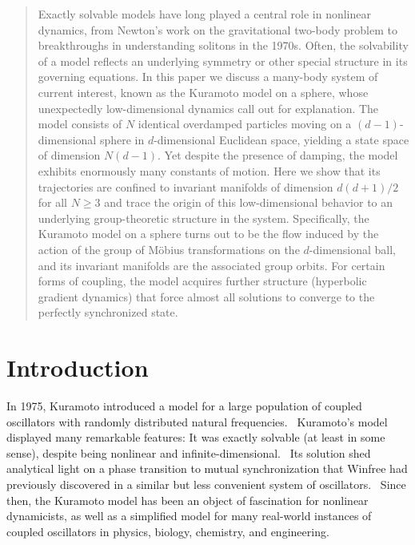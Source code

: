 \documentclass[%
 aip,
 amsmath,amssymb,
 reprint,%
]{revtex4-1}
\begin{document}
\maketitle

\begin{quotation}
Exactly solvable models have long played a central role in nonlinear dynamics, from Newton’s work on the gravitational two-body problem to breakthroughs in understanding solitons in the 1970s. Often, the solvability of a model reflects an underlying symmetry or other special structure in its governing equations. In this paper we discuss a many-body system of current interest, known as the Kuramoto model on a sphere, whose unexpectedly low-dimensional dynamics call out for explanation. The model consists of $N$ identical overdamped particles moving on a $(d-1)$-dimensional sphere in $d$-dimensional Euclidean space, yielding a state space of dimension $N (d-1)$. Yet despite the presence of damping, the model exhibits enormously many constants of motion. Here we show that its trajectories are confined to invariant manifolds of dimension $d(d+1)/2$ for all $N \ge 3$ and trace the origin of this low-dimensional behavior to an underlying group-theoretic structure in the system. Specifically, the Kuramoto model on a sphere turns out to be the flow induced by the action of the group of Möbius transformations on the $d$-dimensional ball, and its invariant manifolds are the associated group orbits. For certain forms of coupling, the model acquires further structure (hyperbolic gradient dynamics) that force almost all solutions to converge to the perfectly synchronized state.  
\end{quotation}  

\section{Introduction} In 1975, Kuramoto introduced a model for a large  population of coupled oscillators with randomly distributed natural frequencies.~\cite{Kuramoto1975self} Kuramoto’s  model displayed many remarkable features: It was exactly solvable (at least in some sense), despite being nonlinear and infinite-dimensional.~\cite{Kuramoto1984chemical} Its  solution shed analytical light on a phase transition to mutual synchronization that Winfree had  previously discovered in a similar but less convenient system of oscillators.~\cite{winfree1967biological, winfree1980} Since then, the  Kuramoto model has been an object of fascination for nonlinear dynamicists, as well as a  simplified model for many real-world instances of coupled oscillators in physics, biology,  chemistry, and engineering.~\cite{strogatz2000Kuramoto, pikovsky2003synchronization, strogatz2003sync, acebron2005Kuramoto, dorfler2014synchronization, pikovsky2015dynamics, rodrigues2016Kuramoto, bick2020understanding} 
\end{document}
